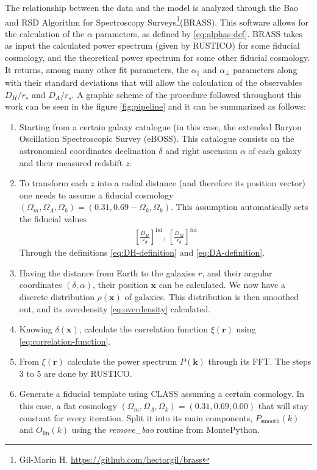 The relationship between the data and the model is analyzed through the Bao and RSD Algorithm for Spectroscopy Surveys\footnote{Gil-Marín H. \url{https://github.com/hectorgil/brass}}(BRASS). This software allows for the calculation of the $\alpha$ parameters, as defined by \eqref{eq:alphas-def}. BRASS takes as input the calculated power spectrum (given by RUSTICO) for some  fiducial cosmology, and the theoretical power spectrum for some other fiducial cosmology. It returns, among many other fit parameters, the $\alpha_\parallel$ and $\alpha_\perp$ parameters along with their standard deviations that will allow the calculation of the observables $D_H/r_s$ and $D_A /r_s$. A graphic scheme of the procedure followed throughout this work can be seen in the figure \ref{fig:pipeline} and it can be summarized as follows:
\begin{enumerate}
	\item Starting from a certain galaxy catalogue (in this case, the extended Baryon Oscillation Spectroscopic Survey (eBOSS). This catalogue consists on the astronomical coordinates declination $\delta$ and right ascension $\alpha$ of each galaxy and their measured redshift $z$.
	\item To transform each $z$ into a radial distance (and therefore its position vector) one needs to assume a fiducial cosmology $(\Omega_m, \Omega_\Lambda, \Omega_k) = (0.31, 0.69-\Omega_k, \Omega_k) $. This assumption automatically sets the fiducial values 
	\begin{align}
		\left[ \frac{D_H}{r_d} \right] ^\text{fid}, \,\left[ \frac{D_M}{r_d} \right] ^\text{fid}
	\end{align}
	Through the definitions \eqref{eq:DH-definition} and \eqref{eq:DA-definition}.
\item Having the distance from Earth to the galaxies $r$, and their angular coordinates $(\delta, \alpha)$, their position $\textbf{x}$ can be calculated. We now have a discrete distribution $\rho(\textbf{x})$ of galaxies. This distribution is then smoothed out, and its overdensity \eqref{eq:overdensity} calculated.
\item Knowing $\delta(\textbf{x})$, calculate the correlation function $\xi(\textbf{r})$ using \eqref{eq:correlation-function}.
\item From $\xi(\textbf{r})$ calculate the power spectrum $P(\textbf{k})$ through its FFT. The steps 3 to 5 are done by RUSTICO.
\item Generate a fiducial template using CLASS assuming a certain cosmology. In this case, a flat cosmology $(\Omega_m, \Omega_\Lambda, \Omega_k) = (0.31, 0.69, 0.00)$ that will stay constant for every iteration. Split it into its main components,  $P_{\text{smooth}}(k)$ and $O_{\text{lin}}(k)$ using the \textit{remove\_bao} routine from MontePython.

\end{enumerate}
